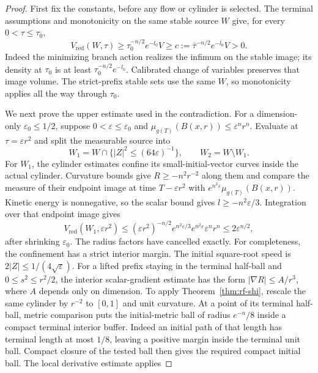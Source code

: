 \begin{proof}
First fix the constants, before any flow or cylinder is selected.  The
terminal assumptions and monotonicity on the same stable source $W$ give,
for every $0<\tau\leq\tau_0$,
\begin{equation}\label{eq:noncollapse-lower}
 V_{\mathrm{red}}(W,\tau)\geq
 \tau_0^{-n/2}e^{-l_0}V\geq
 c:=\bar\tau^{-n/2}e^{-l_0}V>0.
\end{equation}
Indeed the minimizing branch action realizes the infimum on the stable
image; its density at $\tau_0$ is at least
$\tau_0^{-n/2}e^{-l_0}$.  Calibrated change of variables preserves that
image volume.  The strict-prefix stable sets use the same $W$, so
monotonicity applies all the way through $\tau_0$.

We next prove the upper estimate used in the contradiction.  For a
dimension-only $\varepsilon_0\leq1/2$, suppose
$0<\varepsilon\leq\varepsilon_0$ and
$\mu_{g(T)}(B(x,r))\leq\varepsilon^n r^n$.
Evaluate at $\tau=\varepsilon r^2$ and split the measurable source into
\[
 W_1=W\cap\{|Z|^2\leq(64\varepsilon)^{-1}\},\qquad
 W_2=W\setminus W_1.
\]
For $W_1$, the cylinder estimates confine its small-initial-vector curves
inside the actual cylinder.  Curvature bounds give
$R\geq-n^2r^{-2}$ along them and compare the measure of their endpoint
image at time $T-\varepsilon r^2$ with
$e^{n^2\varepsilon}\mu_{g(T)}(B(x,r))$.  Kinetic energy is nonnegative,
so the scalar bound gives $l\geq-n^2\varepsilon/3$.  Integration over
that endpoint image gives
\[
 V_{\mathrm{red}}(W_1,\varepsilon r^2)
 \leq (\varepsilon r^2)^{-n/2}
       e^{n^2\varepsilon/3}e^{n^2\varepsilon}\varepsilon^nr^n
 \leq2\varepsilon^{n/2},
\]
after shrinking $\varepsilon_0$.  The radius factors have cancelled exactly.
For completeness, the confinement has a strict interior margin.  The
initial square-root speed is $2|Z|\leq1/(4\sqrt\varepsilon)$.
For a lifted prefix staying in the terminal half-ball and
$0\leq s^2\leq r^2/2$, the interior scalar-gradient estimate has the form
$|\nabla R|\leq A/r^3$, where $A$ depends only on dimension.
To apply Theorem~\ref{thm:rf-shi}, rescale the same cylinder by $r^{-2}$
to $[0,1]$ and unit curvature.  At a point of its terminal half-ball,
metric comparison puts the initial-metric ball of radius $e^{-n}/8$
inside a compact terminal interior buffer.  Indeed an initial path of that
length has terminal length at most $1/8$, leaving a positive margin inside
the terminal unit ball.  Compact closure of the tested ball then gives
the required compact initial ball.  The local derivative estimate applies

\end{proof}
